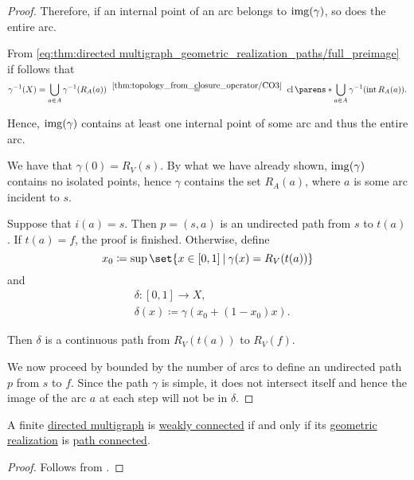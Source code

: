 \begin{proof}
  Therefore, if an internal point of an arc belongs to \( \operatorname{img}(\gamma) \), so does the entire arc.

   From \eqref{eq:thm:directed multigraph_geometric_realization_paths/full_preimage} if follows that
  \begin{equation*}
    \gamma^{-1}(X)
    =
    \bigcup_{a \in A} \gamma^{-1}(R_A(a))
    \reloset{\ref{thm:topology_from_closure_operator/CO3}} =
    \cl\parens*{ \bigcup_{a \in A} \gamma^{-1}(\Int R_A(a)) }.
  \end{equation*}

  Hence, \( \operatorname{img}(\gamma) \) contains at least one internal point of some arc and thus the entire arc.

   We have that \( \gamma(0) = R_V(s) \). By what we have already shown, \( \operatorname{img}(\gamma) \) contains no isolated points, hence \( \gamma \) contains the set \( R_A(a) \), where \( a \) is some arc incident to \( s \).

  Suppose that \( i(a) = s \). Then \( p = (s, a) \) is an undirected path from \( s \) to \( t(a) \). If \( t(a) = f \), the proof is finished. Otherwise, define
  \begin{equation*}
    x_0 \coloneqq \sup\set{ x \in [0, 1] \given \gamma(x) = R_V(t(a)) }
  \end{equation*}
  and
  \begin{equation*}
    \begin{aligned}
      &\delta: [0, 1] \to X, \\
      &\delta(x) \coloneqq \gamma(x_0 + (1 - x_0) x).
    \end{aligned}
  \end{equation*}

  Then \( \delta \) is a continuous path from \( R_V(t(a)) \) to \( R_V(f) \).

  We now proceed by  bounded by the number of arcs to define an undirected path \( p \) from \( s \) to \( f \). Since the path \( \gamma \) is simple, it does not intersect itself and hence the image of the arc \( a \) at each step will not be in \( \delta \).
\end{proof}

\begin{corollary}\label{thm:directed multigraph_geometric_realization_connectedness}
  A finite \hyperref[def:directed_multigraph]{directed multigraph} is \hyperref[def:directed_multigraph_connectedness/weak]{weakly connected} if and only if its \hyperref[def:directed_multigraph_geometric_realization/undirected]{geometric realization} is \hyperref[def:path_connected_space]{path connected}.
\end{corollary}
\begin{proof}
  Follows from .
\end{proof}

